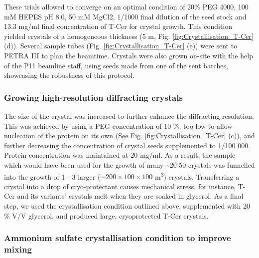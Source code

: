 These trials allowed to converge on an optimal condition of 20\% PEG 4000, 100 mM HEPES pH 8.0, 50 mM MgCl2, 1/1000 final dilution of the seed stock and 13.3 mg/ml final concentration of T-Cer for crystal growth.  This condition yielded crystals of a homogeneous thickness (5 \textmu m, Fig. \ref{fig:Crystallisation_T-Cer} (d)). Several sample tubes (Fig. \ref{fig:Crystallisation_T-Cer} (e)) were sent to PETRA III to plan the beamtime. Crystals were also grown on-site with the help of the P11 beamline staff, using seeds made from one of the sent batches, showcasing the robustness of this protocol. 

\subsubsection{Growing high-resolution diffracting crystals}\label{sec:highrescryst}

The size of the crystal was increased to further enhance the diffracting resolution. This was achieved by using a PEG concentration of 10 \%, too low to allow nucleation of the protein on its own (See Fig. \ref{fig:Crystallisation_T-Cer} (c)), and further decreasing the concentration of crystal seeds supplemented to 1/100 000. Protein concentration was maintained at 20 mg/ml. As a result, the sample which would have been used for the growth of many \textasciitilde 20-50 crystals was funnelled into the growth of 1 - 3 larger (\(\sim 200 \times 100 \times 100 \) \textmu m\textsuperscript{3}) crystals. Transferring a crystal into a drop of cryo-protectant causes mechanical stress, for instance, T-Cer and its variants' crystals melt when they are soaked in glycerol. As a final step, we used the crystallisation condition outlined above, supplemented with 20 \% V/V glycerol, and produced large, cryoprotected T-Cer crystals.

\subsubsection{Ammonium sulfate crystallisation condition to improve mixing}\label{sec:ammonium}


